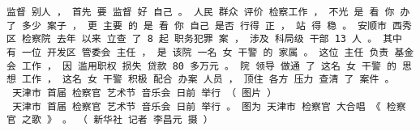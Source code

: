 \documentclass{article}
\begin{document}
\begin{Verbatim}[commandchars=\\\{\}]
 监督 别人 ， 首先 要 监督 好 自己 。 人民 群众 评价 检察工作 ， 不光 是 看 你 办 了 多少 案子 ， 更 主要 的 是 看 你 自己 是否 行得 正 ， 站 得 稳 。 安顺市 西秀区 检察院 去年 以来 立查 了 8 起 职务犯罪 案 ， 涉及 科局级 干部 13 人 。 其中 有 一位 开发区 管委会 主任 ， 是 该院 一名 女 干警 的 家属 。 这位 主任 负责 基金会 工作 ， 因 滥用职权 损失 贷款 80 多万元 。 院 领导 做通 了 这名 女 干警 的 思想 工作 ， 这名 女 干警 积极 配合 办案 人员 ， 顶住 各方 压力 查清 了 案件 。 
 天津市 首届 检察官 艺术节 音乐会 日前 举行 （ 图片 ） 
 天津市 首届 检察官 艺术节 音乐会 日前 举行 。 图为 天津市 检察官 大合唱 《 检察官 之歌 》 。 （ 新华社 记者 李昌元 摄 ）
    \end{Verbatim}


    
    
    
    
\end{document}
